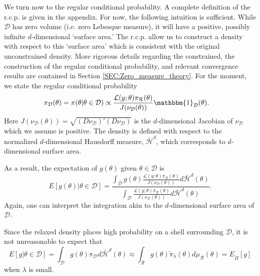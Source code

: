 \documentclass[10pt,fleqn]{article}
\DeclareMathOperator{\1}{\mathbbm{1}}
\begin{document}
{We turn now to the regular conditional probability. A complete definition of the r.c.p. is given in the appendix. For now, the following intuition is sufficient.   While $\mathcal{D}$ has zero volume (i.e. zero Lebesque measure), it will have a positive, possibly infinite $d$-dimensional `surface area.' The r.c.p. allow us to construct a density with respect to this `surface area' which is consistent with the original unconstrained density. More rigorous details regarding the constrained, the construction of the regular conditional probability, and relevant convergence results are contained in Section \ref{SEC:Zero_measure_theory}.  For the moment, we state the regular conditional probability
\begin{equation}
\begin{split}
\pi_\mathcal{D}(\theta) = \pi(\theta| \theta \in \mathcal{D}) 
&\propto \frac{\mathcal{L}(y;\theta)\pi_\mathcal{R}(\theta)}{J(\nu_\mathcal{D}(\theta))}\mathbbm{1}_\mathcal{D}(\theta) .
\end{split}
\end{equation}
Here $J(\nu_\mathcal{D}(\theta)) = \sqrt{(D\nu_\mathcal{D})'(D\nu_\mathcal{D})}$ is the $d$-dimensional Jacobian of $\nu_\mathcal{D}$ which we assume is positive.  The density is defined with respect to the normalized $d$-dimensional Hausdorff measure, $\bar{\mathcal{H}}^d$, which corresponds to $d$-dimensional surface area.  

As a result, the expectation of $g(\theta)$ given $\theta\in\mathcal{D}$ is $$E[g(\theta) | \theta \in \mathcal{D}] = \dfrac{\int_\mathcal{D} g(\theta) \frac{\mathcal{L}(y;\theta)\pi_\mathcal{R}(\theta)}{J(\nu_\mathcal{D}(\theta))}d\bar{\mathcal{H}}^d(\theta) } {\int_\mathcal{D} \frac{\mathcal{L}(y;\theta)\pi_\mathcal{R}(\theta)}{J(\nu_\mathcal{D}(\theta))} d\bar{\mathcal{H}}^d(\theta)}. $$
Again, one can interpret the integration akin to the $d$-dimensional surface area of $\mathcal{D}.$ 

Since the relaxed density places high probability on a shell surrounding $\mathcal{D}$, it is not unreasonable to expect that $$E[g|\theta\in\mathcal{D} ] = \int_\mathcal{D} g(\theta) \pi_\mathcal{D} d\bar{\mathcal{H}}^d(\theta) \approx \int_\mathcal{R} g(\theta) \tilde{\pi}_\lambda(\theta) d\mu_\mathcal{R}(\theta) = E_{\tilde{\Pi}}[g]$$
when $\lambda$ is small.




}
\end{document}
